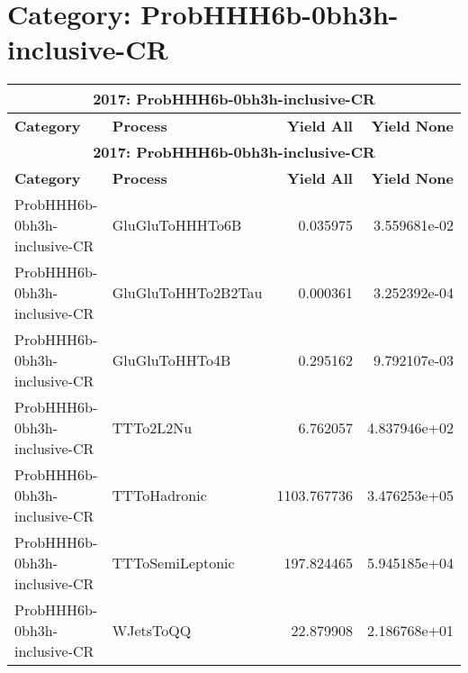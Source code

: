 \documentclass{article}
\begin{document}
\section*{Category: ProbHHH6b-0bh3h-inclusive-CR}
\begin{longtable}[c]{|l|l|r|r|}
\hline
\multicolumn{4}{|c|}{\textbf{2017: ProbHHH6b-0bh3h-inclusive-CR}} \\
\hline
\textbf{Category} & \textbf{Process} & \textbf{Yield All} & \textbf{Yield None} \\
\hline
\endfirsthead
\hline
\multicolumn{4}{|c|}{\textbf{2017: ProbHHH6b-0bh3h-inclusive-CR}} \\
\hline
\textbf{Category} & \textbf{Process} & \textbf{Yield All} & \textbf{Yield None} \\
\hline
\endhead
ProbHHH6b-0bh3h-inclusive-CR & GluGluToHHHTo6B & 0.035975 & 3.559681e-02 \\
\hline
ProbHHH6b-0bh3h-inclusive-CR & GluGluToHHTo2B2Tau & 0.000361 & 3.252392e-04 \\
\hline
ProbHHH6b-0bh3h-inclusive-CR & GluGluToHHTo4B & 0.295162 & 9.792107e-03 \\
\hline
ProbHHH6b-0bh3h-inclusive-CR & TTTo2L2Nu & 6.762057 & 4.837946e+02 \\
\hline
ProbHHH6b-0bh3h-inclusive-CR & TTToHadronic & 1103.767736 & 3.476253e+05 \\
\hline
ProbHHH6b-0bh3h-inclusive-CR & TTToSemiLeptonic & 197.824465 & 5.945185e+04 \\
\hline
ProbHHH6b-0bh3h-inclusive-CR & WJetsToQQ & 22.879908 & 2.186768e+01 \\
\hline
\end{longtable}
\end{document}
